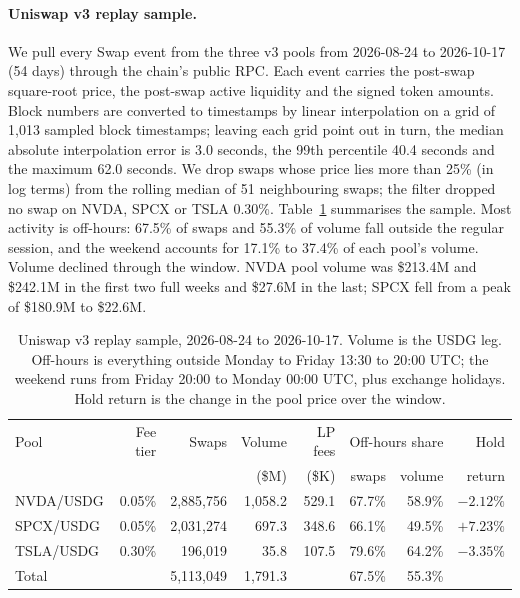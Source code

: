 \documentclass[11pt]{article}
\newcommand{\USD}{\$}
\begin{document}
\paragraph{Uniswap v3 replay sample.} We pull every Swap event from the three v3 pools from 2026-08-24 to 2026-10-17 (54 days) through the chain's public RPC. Each event carries the post-swap square-root price, the post-swap active liquidity and the signed token amounts. Block numbers are converted to timestamps by linear interpolation on a grid of 1,013 sampled block timestamps; leaving each grid point out in turn, the median absolute interpolation error is 3.0 seconds, the 99th percentile 40.4 seconds and the maximum 62.0 seconds. We drop swaps whose price lies more than 25\% (in log terms) from the rolling median of 51 neighbouring swaps; the filter dropped no swap on NVDA, SPCX or TSLA 0.30\%. Table~\ref{tab:data} summarises the sample. Most activity is off-hours: 67.5\% of swaps and 55.3\% of volume fall outside the regular session, and the weekend accounts for 17.1\% to 37.4\% of each pool's volume. Volume declined through the window. NVDA pool volume was \USD213.4M and \USD242.1M in the first two full weeks and \USD27.6M in the last; SPCX fell from a peak of \USD180.9M to \USD22.6M.

\begin{table}[!tbp]
\centering
\small
\caption{Uniswap v3 replay sample, 2026-08-24 to 2026-10-17. Volume is the USDG leg. Off-hours is everything outside Monday to Friday 13:30 to 20:00 UTC; the weekend runs from Friday 20:00 to Monday 00:00 UTC, plus exchange holidays. Hold return is the change in the pool price over the window.}
\label{tab:data}
\begin{tabular}{lrrrrrrr}
\toprule
Pool & Fee tier & Swaps & Volume & LP fees & \multicolumn{2}{c}{Off-hours share} & Hold \\
\cmidrule(lr){6-7}
 & & & (\USD M) & (\USD K) & swaps & volume & return \\
\midrule
NVDA/USDG & 0.05\% & 2,885,756 & 1,058.2 & 529.1 & 67.7\% & 58.9\% & $-2.12\%$ \\
SPCX/USDG & 0.05\% & 2,031,274 & 697.3 & 348.6 & 66.1\% & 49.5\% & $+7.23\%$ \\
TSLA/USDG & 0.30\% & 196,019 & 35.8 & 107.5 & 79.6\% & 64.2\% & $-3.35\%$ \\
\midrule
Total & & 5,113,049 & 1,791.3 & & 67.5\% & 55.3\% & \\
\bottomrule
\end{tabular}
\end{table}
\end{document}
